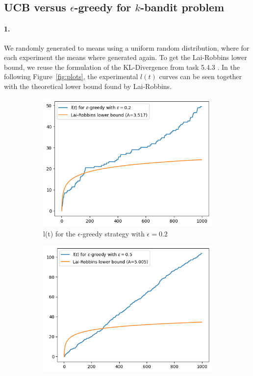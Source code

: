 \subsection{UCB versus $\epsilon$-greedy for $k$-bandit problem}

\paragraph{1.}
We randomly generated to means using a uniform random distribution,
where for each experiment the means where generated again.
To get the Lai-Robbins lower bound, we reuse the formulation of the KL-Divergence from task
5.4.3 . In the following Figure~\ref{fig:plots}, the experimental $l(t)$ curves can be seen together with the
theoretical lower bound found by Lai-Robbins.
\begin{figure}[ht]
    \centering
    \begin{subfigure}{0.45\textwidth}
        \centering
        \includegraphics[scale=0.45]{figures/e02.png}
        \caption{l(t) for the $\epsilon$-greedy strategy with $\epsilon=0.2$}
    \end{subfigure}  
    \begin{subfigure}{0.45\textwidth}
        \centering
        \includegraphics[scale=0.45]{figures/e05.png}

\end{subfigure}
\end{figure}
